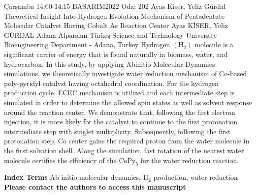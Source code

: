 
    \begin{abstract_basarim}
    {Çarşamba 14:00-14:15}
    {BASARIM2022}
    {Oda: 202}
    {Ayas Kiser, Yeliz Gürdal}
    {Theoretical Insight Into Hydrogen Evolution Mechanism of Pentadentate Molecular Catalyst Having Cobalt As Reaction Center}
    {%
    Ayas KİSER, Yeliz GÜRDAL}
    {%
    }
    {%
    Adana Alparslan Türkeş Science and Technology University Bioengineering Department - Adana, Turkey}
    Hydrogen $\left(\mathrm{H}_{2}\right)$ molecule is a significant carrier of energy that is found naturally in biomass, water, and hydrocarbon. In this study, by applying Abinitio Molecular Dynamics simulations, we theoretically investigate water reduction mechanism of Co-based poly-pyridyl catalyst having octahedral coordination. For the hydrogen production cycle, ECEC mechanism is utilized and each intermediate step is simulated in order to determine the allowed spin states as well as solvent response around the reaction center. We demonstrate that, following the first electron injection, it is more likely for the catalyst to continue to the first protonation intermediate step with singlet multiplicity. Subsequently, following the first protonation step, Co center gains the required proton from the water molecule in the first solvation shell. Along the simulation, fast rotation of the nearest water molecule certifies the efficiency of the $\mathrm{CoPy}_{5}$ for the water reduction reaction. 
    
            \textbf{Index Terms} \newline{}Ab-initio molecular dynamics, $\mathrm{H}_{2}$ production, water reduction
    \newline\newline\noindent \bfseries{Please contact the authors to access this manuscript}
    \end{abstract_basarim}
    
